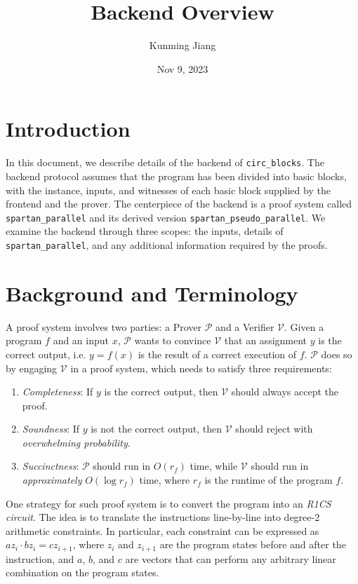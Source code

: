 \documentclass{article}
\title{Backend Overview}
\author{Kunming Jiang}
\date{Nov 9, 2023}
\newcommand{\code}{\texttt}
\renewcommand{\P}{\mathcal{P}}
\newcommand{\V}{\mathcal{V}}
\begin{document}
\maketitle

\section{Introduction}\label{sec:intro}

In this document, we describe details of the backend of \code{circ\_blocks}. The backend protocol assumes that the program has been divided into basic blocks, with the instance, inputs, and witnesses of each basic block supplied by the frontend and the prover. The centerpiece of the backend is a proof system called \code{spartan\_parallel} and its derived version \code{spartan\_pseudo\_parallel}. We examine the backend through three scopes: the inputs, details of \code{spartan\_parallel}, and any additional information required by the proofs.


\section{Background and Terminology}\label{sec:term}

A proof system involves two parties: a Prover $\P$ and a Verifier $\V$. Given a program $f$ and an input $x$, $\P$ wants to convince $\V$ that an assignment $y$ is the correct output, i.e. $y = f(x)$ is the result of a correct execution of $f$. $\P$ does so by engaging $\V$ in a proof system, which needs to satisfy three requirements:
\begin{enumerate}
    \item\label{req:complete} \emph{Completeness}: If $y$ is the correct output, then $\V$ should always accept the proof.
    \item\label{req:sound} \emph{Soundness}: If $y$ is not the correct output, then $\V$ should reject with \emph{overwhelming probability}.
    \item\label{req:succinct} \emph{Succinctness}: $\P$ should run in $O(r_f)$ time, while $\V$ should run in \emph{approximately} $O(\log r_f)$ time, where $r_f$ is the runtime of the program $f$.
\end{enumerate}

One strategy for such proof system is to convert the program into an \emph{R1CS circuit}. The idea is to translate the instructions line-by-line into degree-2 arithmetic constraints. In particular, each constraint can be expressed as $az_i\cdot bz_i = cz_{i+1}$, where $z_i$ and $z_{i+1}$ are the program states before and after the instruction, and $a$, $b$, and $c$ are vectors that can perform any arbitrary linear combination on the program states.
\end{document}
